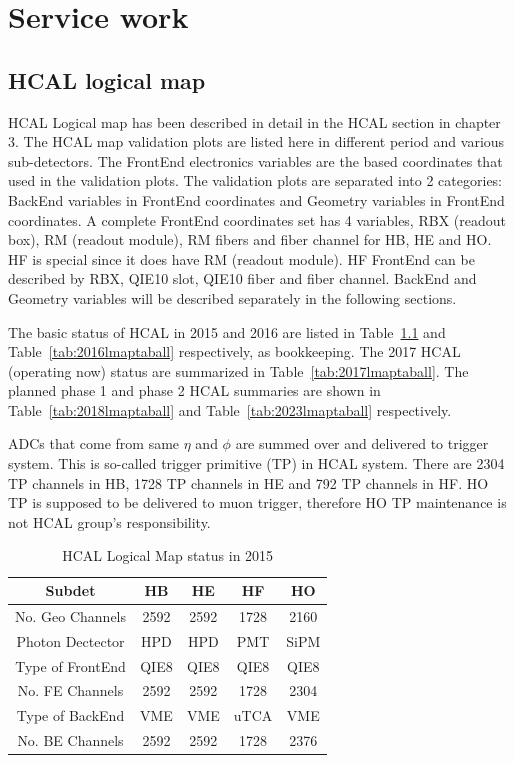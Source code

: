 \chapter{Service work}
\clearpage

\section{HCAL logical map}
HCAL Logical map has been described in detail in the HCAL section in chapter 3. The HCAL map validation plots are listed here in different period and various sub-detectors. The FrontEnd electronics variables are the based coordinates that used in the validation plots. The validation plots are separated into 2 categories: BackEnd variables in FrontEnd coordinates and Geometry variables in FrontEnd coordinates. A complete FrontEnd coordinates set has 4 variables, RBX (readout box), RM (readout module), RM fibers and fiber channel for HB, HE and HO. HF is special since it does have RM (readout module). HF FrontEnd can be described by RBX, QIE10 slot, QIE10 fiber and fiber channel. BackEnd and Geometry variables will be described separately in the following sections.

The basic status of HCAL in 2015 and 2016 are listed in Table~\ref{tab:2015lmaptaball} and Table~\ref{tab:2016lmaptaball} respectively, as bookkeeping. The 2017 HCAL (operating now) status are summarized in Table~\ref{tab:2017lmaptaball}. The planned phase 1 and phase 2 HCAL summaries are shown in Table~\ref{tab:2018lmaptaball} and Table~\ref{tab:2023lmaptaball} respectively.

ADCs that come from same $\eta$ and $\phi$ are summed over and delivered to trigger system. This is so-called trigger primitive (TP) in HCAL system. There are 2304 TP channels in HB, 1728 TP channels in HE and 792 TP channels in HF. HO TP is supposed to be delivered to muon trigger, therefore HO TP maintenance is not HCAL group’s responsibility.
\clearpage

\begin{table}[htb]
\centering
\caption{
HCAL Logical Map status in 2015
}
\label{tab:2015lmaptaball}
\renewcommand{\arraystretch}{1.30}
 \begin{tabular}{ccccc}
  \hline
   Subdet & HB & HE & HF & HO \\
  \hline
   No. Geo Channels  & 2592 & 2592 & 1728 & 2160 \\
   Photon Dectector  & HPD  & HPD  & PMT  & SiPM \\
   Type of FrontEnd  & QIE8 & QIE8 & QIE8 & QIE8 \\
   No. FE Channels   & 2592 & 2592 & 1728 & 2304 \\
   Type of BackEnd   & VME  & VME  & uTCA & VME  \\
   No. BE Channels   & 2592 & 2592 & 1728 & 2376 \\
  \hline
 \end{tabular}
\end{table}

